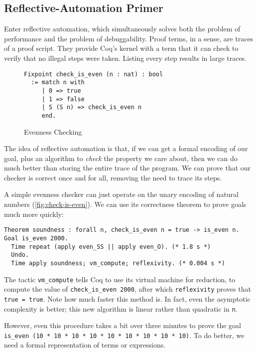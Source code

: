 \subsection{Reflective-Automation Primer}\label{sec:evenness}
Enter reflective automation, which simultaneously solves both the problem of performance and the problem of debuggability.
Proof terms, in a sense, are traces of a proof script.
They provide Coq's kernel with a term that it can check to verify that no illegal steps were taken.
Listing every step results in large traces.

\begin{wrapfigure}[9]{r}{0pt}
\begin{verbatim}
Fixpoint check_is_even (n : nat) : bool
  := match n with
     | 0 => true
     | 1 => false
     | S (S n) => check_is_even n
     end.
\end{verbatim}
\caption{Evenness Checking}\label{fig:check-is-even}
\end{wrapfigure}
The idea of reflective automation is that, if we can get a formal encoding of our goal, plus an algorithm to \emph{check} the property we care about, then we can do much better than storing the entire trace of the program.
We can prove that our checker is correct once and for all, removing the need to trace its steps.

A simple evenness checker can just operate on the unary encoding of natural numbers (\autoref{fig:check-is-even}).
We can use its correctness theorem to prove goals much more quickly:
\begin{verbatim}
Theorem soundness : forall n, check_is_even n = true -> is_even n.
Goal is_even 2000.
  Time repeat (apply even_SS || apply even_O). (* 1.8 s *)
  Undo.
  Time apply soundness; vm_compute; reflexivity. (* 0.004 s *)
\end{verbatim}
The tactic \texttt{vm_compute} tells Coq to use its virtual machine for reduction, to compute the value of \texttt{check_is_even 2000}, after which \texttt{reflexivity} proves that \texttt{true = true}.
Note how much faster this method is.
In fact, even the asymptotic complexity is better; this new algorithm is linear rather than quadratic in \texttt{n}.

However, even this procedure takes a bit over three minutes to prove the goal \texttt{is_even (10 * 10 * 10 * 10 * 10 * 10 * 10 * 10 * 10)}.
To do better, we need a formal representation of terms or expressions.

